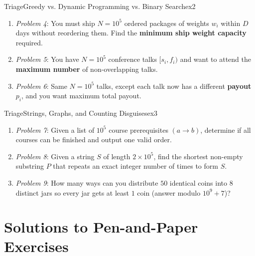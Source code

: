 \documentclass[11pt,a4paper]{article}
\begin{document}
\begin{tryitbox}{Triage}{Greedy vs. Dynamic Programming vs. Binary Search}{ex2}
\begin{enumerate}[itemsep=2pt, topsep=2pt]
    \item \emph{Problem 4}: You must ship $N = 10^5$ ordered packages of weights $w_i$ within $D$ days without reordering them. Find the \textbf{minimum ship weight capacity} required.
    \item \emph{Problem 5}: You have $N = 10^5$ conference talks $[s_i, f_i)$ and want to attend the \textbf{maximum number} of non-overlapping talks.
    \item \emph{Problem 6}: Same $N = 10^5$ talks, except each talk now has a different \textbf{payout} $p_i$, and you want maximum total payout.
\end{enumerate}
\end{tryitbox}

\begin{tryitbox}{Triage}{Strings, Graphs, and Counting Disguises}{ex3}
\begin{enumerate}[itemsep=2pt, topsep=2pt]
    \item \emph{Problem 7}: Given a list of $10^5$ course prerequisites $(a \to b)$, determine if all courses can be finished and output one valid order.
    \item \emph{Problem 8}: Given a string $S$ of length $2 \times 10^5$, find the shortest non-empty substring $P$ that repeats an exact integer number of times to form $S$.
    \item \emph{Problem 9}: How many ways can you distribute $50$ identical coins into $8$ distinct jars so every jar gets at least $1$ coin (answer modulo $10^9 + 7$)?
\end{enumerate}
\end{tryitbox}

\section*{Solutions to Pen-and-Paper Exercises}
\end{document}
